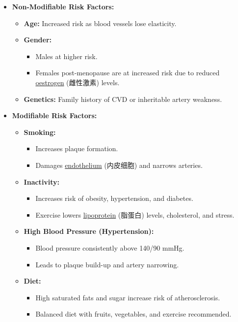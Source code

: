 \begin{itemize}
    \item \textbf{Non-Modifiable Risk Factors:}
    \begin{itemize}
        \item \textbf{Age:} Increased risk as blood vessels lose elasticity.
        \item \textbf{Gender:}
        \begin{itemize}
            \item Males at higher risk.
            \item Females post-menopause are at increased risk due to reduced \underline{oestrogen} (雌性激素) levels.
        \end{itemize}
        \item \textbf{Genetics:} Family history of CVD or inheritable artery weakness.
    \end{itemize}
    \item \textbf{Modifiable Risk Factors:}
    \begin{itemize}
        \item \textbf{Smoking:}
        \begin{itemize}
            \item Increases plaque formation.
            \item Damages \underline{endothelium} (内皮细胞) and narrows arteries.
        \end{itemize}
        \item \textbf{Inactivity:}
        \begin{itemize}
            \item Increases risk of obesity, hypertension, and diabetes.
            \item Exercise lowers \underline{lipoprotein} (脂蛋白) levels, cholesterol, and stress.
        \end{itemize}
        \item \textbf{High Blood Pressure (Hypertension):}
        \begin{itemize}
            \item Blood pressure consistently above 140/90 mmHg.
            \item Leads to plaque build-up and artery narrowing.
        \end{itemize}
        \item \textbf{Diet:}
        \begin{itemize}
            \item High saturated fats and sugar increase risk of atherosclerosis.
            \item Balanced diet with fruits, vegetables, and exercise recommended.
        \end{itemize}
    \end{itemize}
\end{itemize}

